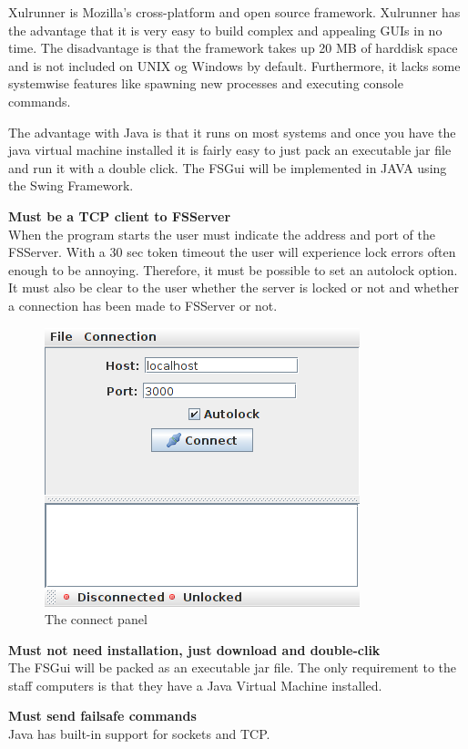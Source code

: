 Xulrunner is Mozilla's cross-platform and open source framework. Xulrunner has the advantage that it is very easy to build complex and appealing GUIs in no time. The disadvantage is that the framework takes up 20 MB of harddisk space and is not included on UNIX og Windows by default. Furthermore, it lacks some systemwise features like spawning new processes and executing console commands.

The advantage with Java is that it runs on most systems and once you have the java virtual machine installed it is fairly easy to just pack an executable jar file and run it with a double click.
The FSGui will be implemented in JAVA using the Swing Framework.

\textbf{Must be a TCP client to FSServer} \\
When the program starts the user must indicate the address and port of the FSServer.
With a 30 sec token timeout the user will experience lock errors often enough to be annoying. Therefore, it must be possible to set an autolock option. It must also be clear to the user whether the server is locked or not and whether a connection has been made to FSServer or not.

\begin{figure}[h!] \centering
	\includegraphics[scale=0.5]{img/fsgui_connect}
  \caption{The connect panel}
\end{figure}

\textbf{Must not need installation, just download and double-clik} \\
The FSGui will be packed as an executable jar file. The only requirement to the staff computers is that they have a Java Virtual Machine installed.

\textbf{Must send failsafe commands} \\
Java has built-in support for sockets and TCP.

